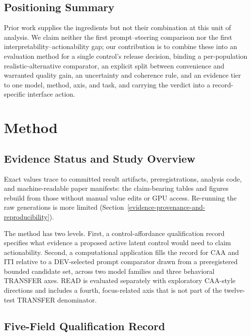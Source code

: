 \documentclass[manuscript,review,anonymous]{acmart}
\begin{document}
\subsection{Positioning Summary}\label{positioning-summary}

Prior work supplies the ingredients but not their combination at this unit of analysis. We claim neither the first prompt--steering comparison nor the first interpretability--actionability gap; our contribution is to combine these into an evaluation method for a single control's release decision, binding a per-population realistic-alternative comparator, an explicit split between convenience and warranted quality gain, an uncertainty and coherence rule, and an evidence tier to one model, method, axis, and task, and carrying the verdict into a record-specific interface action. {}%

\section{Method}\label{method}

\subsection{Evidence Status and Study Overview}\label{evidence-status-and-study-overview}

Exact values trace to committed result artifacts, preregistrations, analysis code, and machine-readable paper manifests: the claim-bearing tables and figures rebuild from those without manual value edits or GPU access. Re-running the raw generations is more limited (Section~\ref{evidence-provenance-and-reproducibility}). {}%

The method has two levels. First, a control-affordance qualification record specifies what evidence a proposed active latent control would need to claim actionability. Second, a computational application fills the record for CAA and ITI relative to a DEV-selected prompt comparator drawn from a preregistered bounded candidate set, across two model families and three behavioral TRANSFER axes. {}%
READ is evaluated separately with exploratory CAA-style directions and includes a fourth, focus-related axis that is not part of the twelve-test TRANSFER denominator. {}%
{}%

\subsection{Five-Field Qualification Record}\label{five-field-qualification-record}
\end{document}
